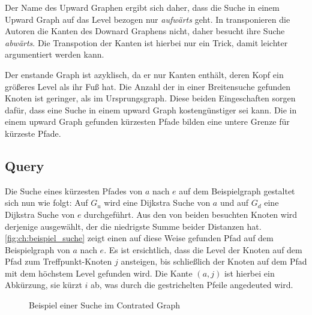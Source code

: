 Der Name des Upward Graphen ergibt sich daher, dass die Suche in einem Upward Graph auf das Level bezogen nur \emph{aufwärts} geht.
In \cite{geisberger2008contraction} transponieren die Autoren die Kanten des Downard Graphens nicht, daher besucht ihre Suche \emph{abwärts}.
Die Transpotion der Kanten ist hierbei nur ein Trick, damit leichter argumentiert werden kann.

Der enstande Graph ist azyklisch, da er nur Kanten enthält, deren Kopf ein größeres Level als ihr Fuß hat.
Die Anzahl der in einer Breitensuche gefunden Knoten ist geringer, als im Ursprungsgraph.
Diese beiden Eingeschaften sorgen dafür, dass eine Suche in einem upward Graph kostengünstiger sei kann.
Die in einem upward Graph gefunden kürzesten Pfade bilden eine untere Grenze für kürzeste Pfade.


\subsection{Query}

Die Suche eines kürzesten Pfades von $a$ nach $e$ auf dem Beispielgraph gestaltet sich nun wie folgt:
Auf $G_u$ wird eine Dijkstra Suche von $a$ und auf $G_d$ eine Dijkstra Suche von $e$ durchgeführt.
Aus den von beiden besuchten Knoten wird derjenige ausgewählt, der die niedrigste Summe beider Distanzen hat.
\autoref{fig:ch:beispiel_suche} zeigt einen auf diese Weise gefunden Pfad auf dem Beispielgraph von $a$ nach $e$.
Es ist ersichtlich, dass die Level der Knoten auf dem Pfad zum Treffpunkt-Knoten $j$ ansteigen, bis schließlich der Knoten auf dem Pfad mit dem höchstem Level gefunden wird.
Die Kante $(a, j)$ ist hierbei ein Abkürzung, sie kürzt $i$ ab, was durch die gestrichelten Pfeile angedeuted wird.

\begin{figure}[ht]
    \centering
    \caption{Beispiel einer Suche im Contrated Graph}
    \label{fig:ch:beispiel_suche}
\end{figure}

